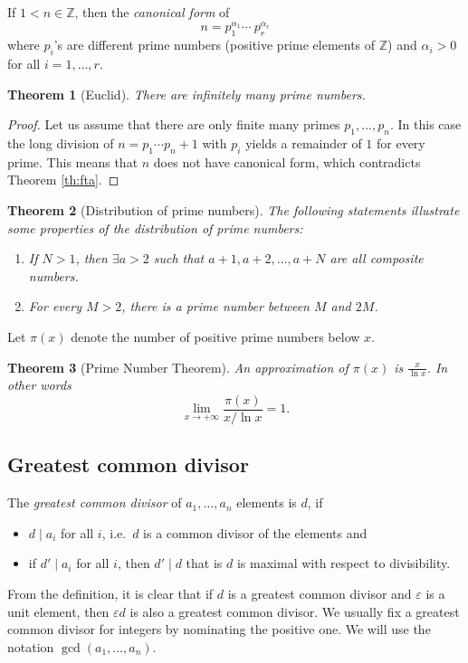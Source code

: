 \documentclass{article}
\newcommand{\Z}{\mathbb{Z}}
\newtheorem{theorem}{Theorem}
\begin{document}
If $1 < n \in \Z$, then the \emph{canonical form} of
\[
    n = p_1^{\alpha_1} \cdots \ p_r^{\alpha_r}
\]
where $p_i$'s are different prime numbers (positive prime elements of $\Z$) and $\alpha_i > 0$ for all $i=1,\ldots,r$.

\begin{theorem}[Euclid]
    There are infinitely many prime numbers.
\end{theorem}
\begin{proof}
    Let us assume that there are only finite many primes $p_1,\ldots,p_n$.
    In this case the long division of $n = p_1 \cdots p_n + 1$ with $p_i$ yields a remainder of $1$ for every prime.
    This means that $n$ does not have canonical form, which contradicts Theorem \ref{th:fta}.
\end{proof}

\begin{theorem}[Distribution of prime numbers]
    The following statements illustrate some properties of the distribution of prime numbers:

    \begin{enumerate}
        \item If $N > 1$, then $\exists a > 2$ such that $a + 1, a + 2, \ldots, a+N$ are all composite numbers.
        \item For every $M > 2$, there is a prime number between $M$ and $2M$.
    \end{enumerate}
\end{theorem}

Let $\pi(x)$ denote the number of positive prime numbers below $x$.
\begin{theorem}[Prime Number Theorem]
    An approximation of $\pi(x)$ is $\frac{x}{\ln x}$. In other words
    \[
        \lim_{x \to +\infty} \frac{\pi(x)}{x/\ln x} = 1.
    \]
\end{theorem}

\subsection{Greatest common divisor}

The \emph{greatest common divisor} of $a_1,\ldots,a_n$ elements is $d$, if
\begin{itemize}
    \item $d \mid a_i$ for all $i$, i.e.\ $d$ is a common divisor of the elements and
    \item if $d' \mid a_i$ for all $i$, then $d' \mid d$ that is $d$ is maximal with respect to divisibility.
\end{itemize}
From the definition, it is clear that if $d$ is a greatest common divisor and $\varepsilon$ is a unit element, then $\varepsilon d$ is also a greatest common divisor.
We usually fix a greatest common divisor for integers by nominating the positive one.
We will use the notation $\gcd \left(a_1,\ldots,a_n \right)$.
\end{document}
